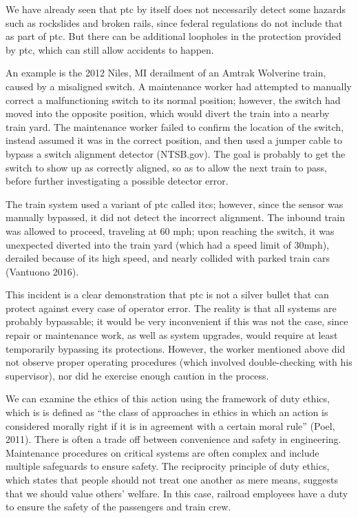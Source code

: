 \documentclass[11pt, titlepage]{article}
\begin{document}
We have already seen that \gls{ptc} by itself does not necessarily detect some
hazards such as rockslides and broken rails, since federal regulations do not
include that as part of \gls{ptc}. But there can be additional loopholes in the
protection provided by \gls{ptc}, which can still allow accidents to happen.

An example is the 2012 Niles, MI derailment of an Amtrak Wolverine train, caused by
a misaligned switch. A maintenance worker had attempted to manually correct a
malfunctioning switch to its normal position; however, the switch had moved into the
opposite position, which would divert the train into a nearby train yard. The
maintenance worker failed to confirm the location of the switch, instead assumed it
was in the correct position, and then used a jumper cable to bypass a switch
alignment detector (NTSB.gov). The goal is probably to get the switch to show up as
correctly aligned, so as to allow the next train to pass, before further
investigating a possible detector error.

The train system used a variant of \gls{ptc} called \gls{itcs}; however, since the
sensor was manually bypassed, it did not detect the incorrect alignment. The inbound
train was allowed to proceed, traveling at 60 mph; upon reaching the switch, it was
unexpected diverted into the train yard (which had a speed limit of 30mph), derailed
because of its high speed, and nearly collided with parked train cars (Vantuono
2016).

This incident is a clear demonstration that \gls{ptc} is not a silver bullet that
can protect against every case of operator error. The reality is that all systems
are probably bypassable; it would be very inconvenient if this was not the case,
since repair or maintenance work, as well as system upgrades, would require at least
temporarily bypassing its protections. However, the worker mentioned above did not
observe proper operating procedures (which involved double-checking with his
supervisor), nor did he exercise enough caution in the process.

We can examine the ethics of this action using the framework of duty ethics, which
is is defined as ``the class of approaches in ethics in which an action is
considered morally right if it is in agreement with a certain moral rule'' (Poel,
2011). There is often a trade off between convenience and safety in engineering.
Maintenance procedures on critical systems are often complex and include multiple
safeguards to ensure safety. The reciprocity principle of duty ethics, which states
that people should not treat one another as mere means, suggests that we should
value others’ welfare. In this case, railroad employees have a duty to ensure the
safety of the passengers and train crew.
\end{document}
